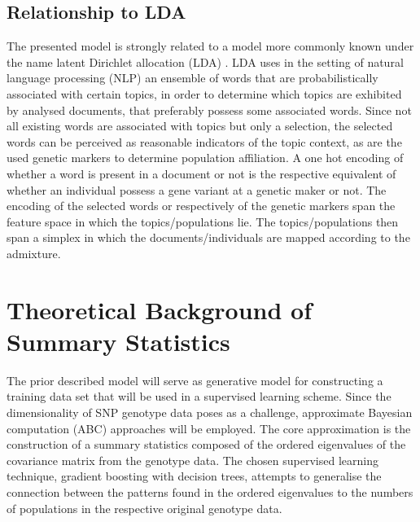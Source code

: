 \documentclass[a4paper, 11pt]{article}
\begin{document}
\subsection{Relationship to LDA}
The presented model is strongly related to a model more commonly known under the name latent Dirichlet allocation (LDA) \cite{blei2003latent}. LDA uses in the setting of natural language processing (NLP) an ensemble of words that are probabilistically associated with certain topics, in order to determine which topics are exhibited by analysed documents, that preferably possess some associated words. Since not all existing words are associated with topics but only a selection, the selected words can be perceived as reasonable indicators of the topic context, as are the used genetic markers to determine population affiliation. A one hot encoding of whether a word is present in a document or not is the respective equivalent of whether an individual possess a gene variant at a genetic maker or not. The encoding of the selected words or respectively of the genetic markers span the feature space in which the topics/populations lie. The topics/populations then span a simplex in which the documents/individuals are mapped according to the admixture.\\



\section{Theoretical Background of Summary Statistics}

The prior described model will serve as generative model for constructing a training data set that will be used in a supervised learning scheme. Since the dimensionality of SNP genotype data poses as a challenge, approximate Bayesian computation (ABC) approaches will be employed. The core approximation is the construction of a summary statistics composed of the ordered eigenvalues of the covariance matrix from the genotype data. The chosen supervised learning technique, gradient boosting with decision trees, attempts to generalise the connection between the patterns found in the ordered eigenvalues to the numbers of populations in the respective original genotype data.
\end{document}
